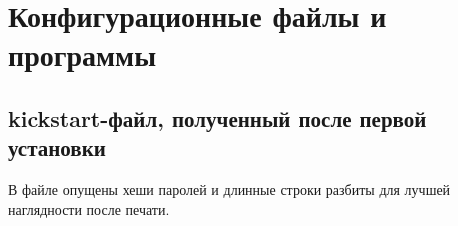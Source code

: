 \chapter{Конфигурационные файлы и программы}


\section{kickstart-файл, полученный после первой установки}
\label{app:kickstart}

В файле опущены хеши паролей и длинные строки разбиты для
лучшей наглядности после печати.


